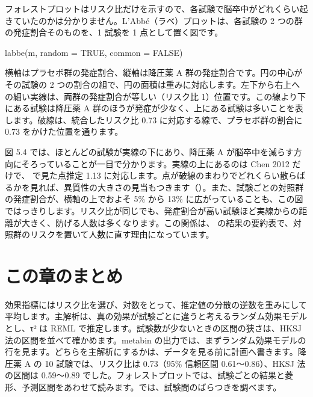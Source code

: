 フォレストプロットはリスク比だけを示すので、各試験で脳卒中がどれくらい起きていたのかは分かりません。L'Abbé（ラベ）プロットは、各試験の 2 つの群の発症割合そのものを、1 試験を 1 点として置く図です。

\begin{rcode}
labbe(m, random = TRUE, common = FALSE)
\end{rcode}


横軸はプラセボ群の発症割合、縦軸は降圧薬 A 群の発症割合です。円の中心がその試験の 2 つの割合の組で、円の面積は重みに対応します。左下から右上への細い実線は、両群の発症割合が等しい（リスク比 1）位置です。この線より下にある試験は降圧薬 A 群のほうが発症が少なく、上にある試験は多いことを表します。破線は、統合したリスク比 0.73 に対応する線で、プラセボ群の割合に 0.73 をかけた位置を通ります。

図 5.4 では、ほとんどの試験が実線の下にあり、降圧薬 A が脳卒中を減らす方向にそろっていることが一目で分かります。実線の上にあるのは Chen 2012 だけで、 で見た点推定 1.13 に対応します。点が破線のまわりでどれくらい散らばるかを見れば、異質性の大きさの見当もつきます（）。また、試験ごとの対照群の発症割合が、横軸の上でおよそ 5\% から 13\% に広がっていることも、この図ではっきりします。リスク比が同じでも、発症割合が高い試験ほど実線からの距離が大きく、防げる人数は多くなります。この関係は、 の結果の要約表で、対照群のリスクを置いて人数に直す理由になっています。

\section{この章のまとめ}
\label{sec:05-10}

効果指標にはリスク比を選び、対数をとって、推定値の分散の逆数を重みにして平均します。主解析は、真の効果が試験ごとに違うと考えるランダム効果モデルとし、τ² は REML で推定します。試験数が少ないときの区間の狭さは、HKSJ 法の区間を並べて確かめます。metabin の出力では、まずランダム効果モデルの行を見ます。どちらを主解析にするかは、データを見る前に計画へ書きます。降圧薬 A の 10 試験では、リスク比は 0.73（95\% 信頼区間 0.61〜0.86）、HKSJ 法の区間は 0.59〜0.89 でした。フォレストプロットでは、試験ごとの結果と菱形、予測区間をあわせて読みます。では、試験間のばらつきを調べます。
